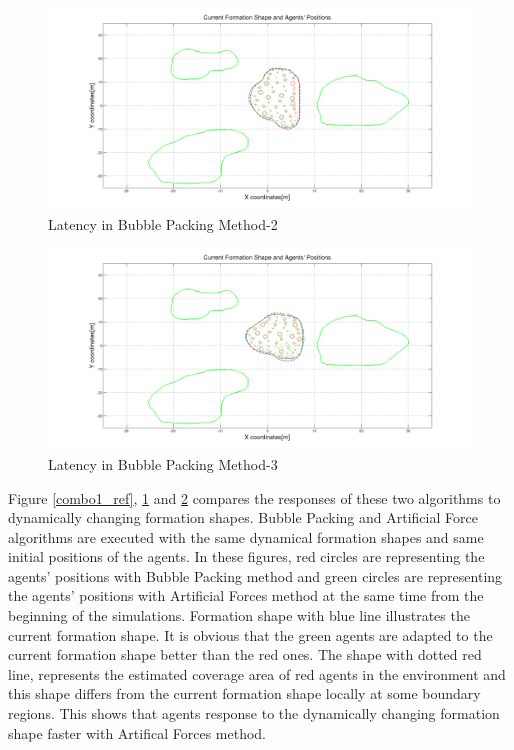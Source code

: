 \begin{figure}[H]
\caption{Latency in Bubble Packing Method-2} \label{combo2_ref}
\centerline{\includegraphics[scale = 0.30]{combo2}}
\end{figure} 

\begin{figure}[H]
\caption{Latency in Bubble Packing Method-3} \label{combo3_ref}
\centerline{\includegraphics[scale = 0.30]{combo3}}
\end{figure} 

Figure \ref{combo1_ref}, \ref{combo2_ref} and \ref{combo3_ref} compares the responses of these two algorithms to dynamically changing formation shapes. Bubble Packing and Artificial Force algorithms are executed with the same dynamical formation shapes and same initial positions of the agents. In these figures, red circles are representing the agents' positions with Bubble Packing method and green circles are representing the agents' positions with Artificial Forces method at the same time from the beginning of the simulations. Formation shape with blue line illustrates the current formation shape. It is obvious that the green agents are adapted to the current formation shape better than the red ones. The shape with dotted red line, represents the estimated coverage area of red agents in the environment and this shape differs from the current formation shape locally at some boundary regions. This shows that agents response to the dynamically changing formation shape faster with Artifical Forces method. 

